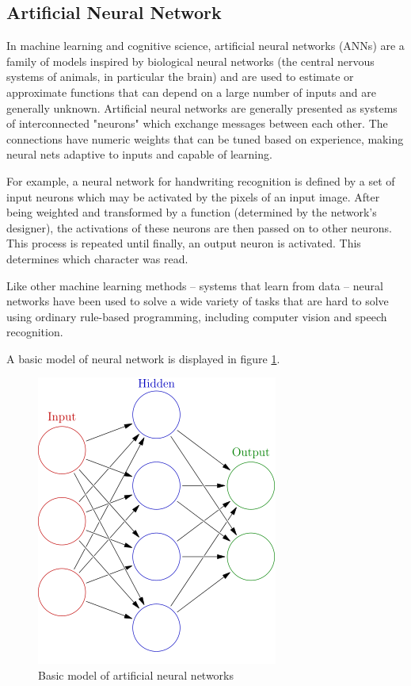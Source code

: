 \documentclass[14pt,a4paper]{extarticle}
\begin{document}
	
	
	\subsection{Artificial Neural Network}
	In machine learning and cognitive science, artificial neural networks (ANNs) are a family of models inspired by biological neural networks (the central nervous systems of animals, in particular the brain) and are used to estimate or approximate functions that can depend on a large number of inputs and are generally unknown. Artificial neural networks are generally presented as systems of interconnected "neurons" which exchange messages between each other. The connections have numeric weights that can be tuned based on experience, making neural nets adaptive to inputs and capable of learning.

For example, a neural network for handwriting recognition is defined by a set of input neurons which may be activated by the pixels of an input image. After being weighted and transformed by a function (determined by the network's designer), the activations of these neurons are then passed on to other neurons. This process is repeated until finally, an output neuron is activated. This determines which character was read.

Like other machine learning methods – systems that learn from data – neural networks have been used to solve a wide variety of tasks that are hard to solve using ordinary rule-based programming, including computer vision and speech recognition.

A basic model of neural network is displayed in figure \ref{fig:neural_net_model}.

		\begin{figure}[H]
			\includegraphics[width=.4\textwidth, center]{neural_net_example.png}
			\caption{Basic model of artificial neural networks}
			\label{fig:neural_net_model}
		\end{figure}
	
\end{document}

